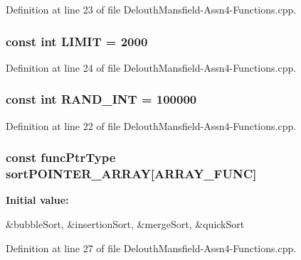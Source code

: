 Definition at line 23 of file DelouthMansfield-\/Assn4-\/Functions.cpp.

\hypertarget{_delouth_mansfield-_assn4-_functions_8cpp_ab73857997d2049218b288a815758cb46}{
\subsubsection[{LIMIT}]{\setlength{\rightskip}{0pt plus 5cm}const int {\bf LIMIT} = 2000}}
\label{_delouth_mansfield-_assn4-_functions_8cpp_ab73857997d2049218b288a815758cb46}


Definition at line 24 of file DelouthMansfield-\/Assn4-\/Functions.cpp.

\hypertarget{_delouth_mansfield-_assn4-_functions_8cpp_a134c2ba56ae9ba89c77a5c0dba9f2124}{
\subsubsection[{RAND\_\-INT}]{\setlength{\rightskip}{0pt plus 5cm}const int {\bf RAND\_\-INT} = 100000}}
\label{_delouth_mansfield-_assn4-_functions_8cpp_a134c2ba56ae9ba89c77a5c0dba9f2124}


Definition at line 22 of file DelouthMansfield-\/Assn4-\/Functions.cpp.

\hypertarget{_delouth_mansfield-_assn4-_functions_8cpp_ae039780346621e190c7726c08c9a1a13}{
\subsubsection[{sortPOINTER\_\-ARRAY}]{\setlength{\rightskip}{0pt plus 5cm}const {\bf funcPtrType} {\bf sortPOINTER\_\-ARRAY}\mbox{[}{\bf ARRAY\_\-FUNC}\mbox{]}}}
\label{_delouth_mansfield-_assn4-_functions_8cpp_ae039780346621e190c7726c08c9a1a13}
{\bfseries Initial value:}
\begin{DoxyCode}
 {&bubbleSort,
                                          &insertionSort,
                                          &mergeSort,
                                                   &quickSort}
\end{DoxyCode}


Definition at line 27 of file DelouthMansfield-\/Assn4-\/Functions.cpp.

